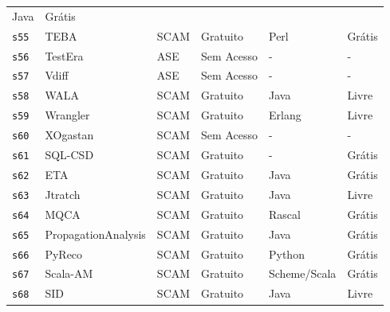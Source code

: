 \begin{longtable}{l l l l p{3cm} l}
      Java &
      Grátis \\
    \texttt{s55} &
      TEBA &
      SCAM &
      Gratuito &
      Perl &
      Grátis \\
    \texttt{s56} &
      TestEra &
      ASE &
      Sem Acesso &
      - &
      - \\
    \texttt{s57} &
      Vdiff &
      ASE &
      Sem Acesso &
      - &
      - \\
    \texttt{s58} &
      WALA &
      SCAM &
      Gratuito &
      Java &
      Livre \\
    \texttt{s59} &
      Wrangler &
      SCAM &
      Gratuito &
      Erlang &
      Livre \\
    \texttt{s60} &
      XOgastan &
      SCAM &
      Sem Acesso &
      - &
      - \\
    \texttt{s61} &
      SQL-CSD &
      SCAM &
      Gratuito &
      - &
      Grátis \\
    \texttt{s62} &
      ETA &
      SCAM &
      Gratuito &
      Java &
      Grátis \\
    \texttt{s63} &
      Jtratch &
      SCAM &
      Gratuito &
      Java &
      Livre \\
    \texttt{s64} &
      MQCA &
      SCAM &
      Gratuito &
      Rascal &
      Grátis \\
    \texttt{s65} &
      PropagationAnalysis &
      SCAM &
      Gratuito &
      Java &
      Grátis \\
    \texttt{s66} &
      PyReco &
      SCAM &
      Gratuito &
      Python &
      Grátis \\
    \texttt{s67} &
      Scala-AM &
      SCAM &
      Gratuito &
      Scheme/Scala &
      Grátis \\
    \texttt{s68} &
      SID &
      SCAM &
      Gratuito &
      Java &
      Livre \\
  \hline
\end{longtable}
